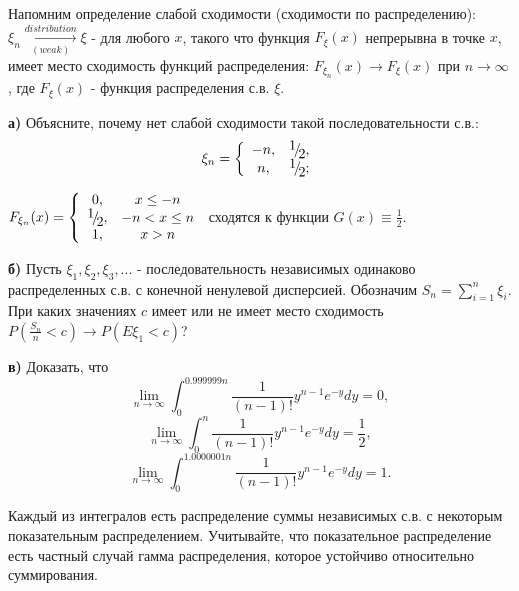 \begin{problem}
Напомним определение слабой сходимости (сходимости по распределению): $\xi _{n} \mathop{\to }\limits_{(weak)}^{distribution} \xi $ - для любого $x$, такого что функция $F_{\xi } (x)$ непрерывна в точке $x$, имеет место сходимость функций распределения: $F_{\xi _{n} } (x)\to F_{\xi } (x)$ при $n\to \infty $, где $F_{\xi } (x)$ - функция распределения с.в. $\xi $.

\noindent \textbf{а)} Объясните, почему нет слабой сходимости такой последовательности с.в.:
\[\xi _{n} =\left\{\begin{array}{cc} {-n,} & {{\raise0.7ex\hbox{$ 1 $}\!\mathord{\left/ {\vphantom {1 2}} \right. \kern-\nulldelimiterspace}\!\lower0.7ex\hbox{$ 2 $}} ,} \\ {n,} & {{\raise0.7ex\hbox{$ 1 $}\!\mathord{\left/ {\vphantom {1 2}} \right. \kern-\nulldelimiterspace}\!\lower0.7ex\hbox{$ 2 $}} ;} \end{array}\right. \] 

\begin{ordre} 

\noindent $F_{\xi _{n} } (x)=\left\{\begin{array}{cc} {0,} & {x\le -n} \\ {{\raise0.7ex\hbox{$ 1 $}\!\mathord{\left/ {\vphantom {1 2}} \right. \kern-\nulldelimiterspace}\!\lower0.7ex\hbox{$ 2 $}} ,} & {-n<x\le n} \\ {1,} & {x>n} \end{array}\right. $ сходятся к функции $G(x)\equiv \frac{1}{2} $.

\end{ordre} 

\noindent \textbf{б)} Пусть $\xi _{1} ,\xi _{2} ,\xi _{3} ,...$ - последовательность независимых одинаково распределенных с.в. с конечной ненулевой дисперсией. Обозначим $S_{n} =\sum _{i=1}^{n}\xi _{i}  $. При каких значениях $c$ имеет или не имеет место сходимость $P\left(\frac{S_{n} }{n} <c\right)\to P\left(E\xi _{1} <c\right)$?

\noindent \textbf{в)} Доказать, что
\[\mathop{\lim }\limits_{n\to \infty } \int _{0}^{0.999999n}\frac{1}{(n-1)!} y^{n-1} e^{-y} dy =0,\] 
\[\mathop{\lim }\limits_{n\to \infty } \int _{0}^{n}\frac{1}{(n-1)!} y^{n-1} e^{-y} dy =\frac{1}{2} ,\] 
\[\mathop{\lim }\limits_{n\to \infty } \int _{0}^{1.0000001n}\frac{1}{(n-1)!} y^{n-1} e^{-y} dy =1.\] 

\begin{ordre} 

Каждый из интегралов есть распределение суммы независимых с.в. с некоторым показательным распределением. Учитывайте, что показательное распределение есть частный случай гамма распределения, которое устойчиво относительно суммирования.


\end{ordre}
\end{problem}
